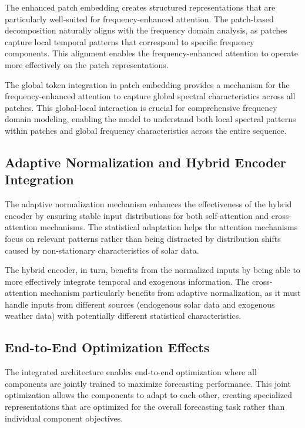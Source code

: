 \documentclass[12pt]{uomthesis}
\begin{document}
The enhanced patch embedding creates structured representations that are particularly well-suited for frequency-enhanced attention. The patch-based decomposition naturally aligns with the frequency domain analysis, as patches capture local temporal patterns that correspond to specific frequency components. This alignment enables the frequency-enhanced attention to operate more effectively on the patch representations.

The global token integration in patch embedding provides a mechanism for the frequency-enhanced attention to capture global spectral characteristics across all patches. This global-local interaction is crucial for comprehensive frequency domain modeling, enabling the model to understand both local spectral patterns within patches and global frequency characteristics across the entire sequence.

\subsection{Adaptive Normalization and Hybrid Encoder Integration}

The adaptive normalization mechanism enhances the effectiveness of the hybrid encoder by ensuring stable input distributions for both self-attention and cross-attention mechanisms. The statistical adaptation helps the attention mechanisms focus on relevant patterns rather than being distracted by distribution shifts caused by non-stationary characteristics of solar data.

The hybrid encoder, in turn, benefits from the normalized inputs by being able to more effectively integrate temporal and exogenous information. The cross-attention mechanism particularly benefits from adaptive normalization, as it must handle inputs from different sources (endogenous solar data and exogenous weather data) with potentially different statistical characteristics.

\subsection{End-to-End Optimization Effects}

The integrated architecture enables end-to-end optimization where all components are jointly trained to maximize forecasting performance. This joint optimization allows the components to adapt to each other, creating specialized representations that are optimized for the overall forecasting task rather than individual component objectives.
\end{document}
